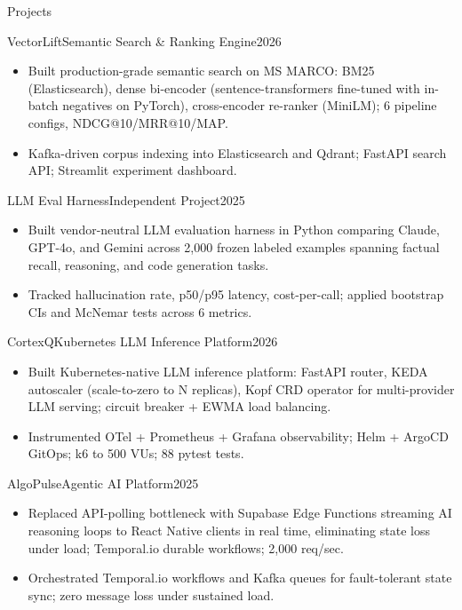 \documentclass[]{mcdowellcv}
\begin{document}
\begin{cvsection}{Projects}
  \begin{cvsubsection}{VectorLift}{Semantic Search \& Ranking Engine}{2026}
    \begin{itemize}
      \item Built production-grade semantic search on MS MARCO: BM25 (Elasticsearch), dense bi-encoder (sentence-transformers fine-tuned with in-batch negatives on PyTorch), cross-encoder re-ranker (MiniLM); 6 pipeline configs, NDCG@10/MRR@10/MAP.
      \item Kafka-driven corpus indexing into Elasticsearch and Qdrant; FastAPI search API; Streamlit experiment dashboard.
    \end{itemize}
    \vspace{-1.5pt}
  \end{cvsubsection}

  \begin{cvsubsection}{LLM Eval Harness}{Independent Project}{2025}
    \begin{itemize}
      \item Built vendor-neutral LLM evaluation harness in Python comparing Claude, GPT-4o, and Gemini across 2,000 frozen labeled examples spanning factual recall, reasoning, and code generation tasks.
      \item Tracked hallucination rate, p50/p95 latency, cost-per-call; applied bootstrap CIs and McNemar tests across 6 metrics.
    \end{itemize}
    \vspace{-1.5pt}
  \end{cvsubsection}

  \begin{cvsubsection}{CortexQ}{Kubernetes LLM Inference Platform}{2026}
    \begin{itemize}
      \item Built Kubernetes-native LLM inference platform: FastAPI router, KEDA autoscaler (scale-to-zero to N replicas), Kopf CRD operator for multi-provider LLM serving; circuit breaker + EWMA load balancing.
      \item Instrumented OTel + Prometheus + Grafana observability; Helm + ArgoCD GitOps; k6 to 500 VUs; 88 pytest tests.
    \end{itemize}
    \vspace{-1.5pt}
  \end{cvsubsection}

  \begin{cvsubsection}{AlgoPulse}{Agentic AI Platform}{2025}
    \begin{itemize}
      \item Replaced API-polling bottleneck with Supabase Edge Functions streaming AI reasoning loops to React Native clients in real time, eliminating state loss under load; Temporal.io durable workflows; 2,000 req/sec.
      \item Orchestrated Temporal.io workflows and Kafka queues for fault-tolerant state sync; zero message loss under sustained load.
    \end{itemize}
  \end{cvsubsection}
\end{cvsection}
\end{document}
